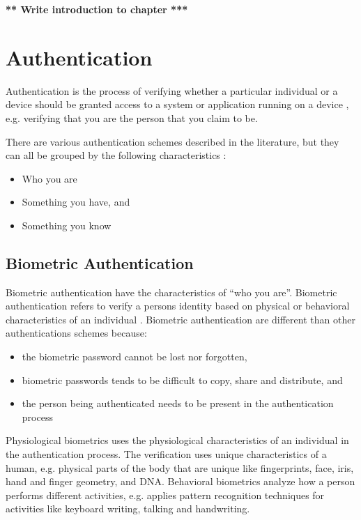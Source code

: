   
  {\bf *** Write introduction to chapter ***}

  \clearpage

  \section{Authentication}

  Authentication is the process of verifying whether a particular individual or a device should be granted access to a system or application running on a device \cite{IPAS}, e.g. verifying that you are the person that you claim to be.

  There are various authentication schemes described in the literature, but they can all be grouped by the following characteristics \cite{IPAS}:

    \begin{itemize}
      \item Who you are
      \item Something you have, and
      \item Something you know
    \end{itemize}

    \subsection{Biometric Authentication}
    Biometric authentication have the characteristics of ``who you are''. Biometric authentication refers to verify a persons identity based on physical or behavioral characteristics of an individual \cite{biometrics, biometrics2}. Biometric authentication are different than other authentications schemes because:

      \begin{itemize}
        \item the biometric password cannot be lost nor forgotten,
        \item biometric passwords tends to be difficult to copy, share and distribute, and 
        \item the person being authenticated needs to be present in the authentication process
      \end{itemize} 

     Physiological biometrics uses the physiological characteristics of an individual in the authentication process. The verification uses unique characteristics of a human, e.g. physical parts of the body that are unique like fingerprints, face, iris, hand and finger geometry, and DNA. Behavioral biometrics analyze how a person performs different activities, e.g. applies pattern recognition techniques for activities like keyboard writing, talking and handwriting.

